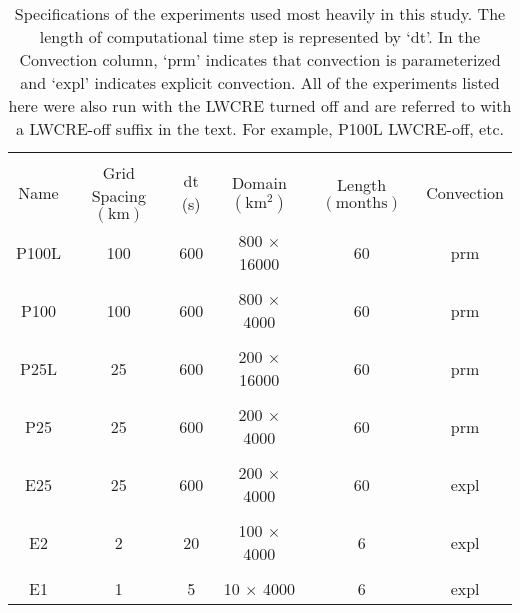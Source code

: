 \documentclass[draft]{agujournal2019}
\begin{document}
%
%

\begin{table}

\begin{center}
\caption{Specifications of the experiments used most heavily in this study.  The length of computational time step is represented by `dt'.  In the Convection
column, `prm'  indicates that convection is parameterized and `expl' indicates explicit convection.
All of the experiments listed here were also run with the LWCRE turned off and are referred to with a LWCRE-off suffix in the text.
For example, P100L LWCRE-off, etc.  }
    \begin{tabular}{*{6}{c}}
    \hline
    \hline
    \\
 Name & Grid Spacing $(\mathrm{km})$ & dt (s) & Domain $ (\mathrm{km^2}) $& Length $(\mathrm{months}) $ & Convection     \\ \hline
  P100L &  100      & 600    &   800 $\times$ 16000    &  60              & prm                   \\ 
    \\
  P100 &  100     & 600           & 800 $\times$ 4000     & 60            & prm                     \\  
    \\
  P25L &  25    & 600         & 200 $\times$ 16000      & 60             & prm                     \\  
    \\
  P25  &  25    & 600         & 200 $\times$ 4000      & 60             & prm                   \\  
    \\
 E25  &   25   & 600       & 200 $\times$ 4000      & 60             & expl                \\  
    \\
 E2   &   2   & 20       & 100 $\times$ 4000      & 6             & expl                   \\ 
    \\
 E1   &   1    & 5      & 10 $\times$ 4000      & 6             & expl                 \\  \hline

    \end{tabular}\par
    \label{tab:experimentspecs}
\end{center}
\end{table}
\end{document}
